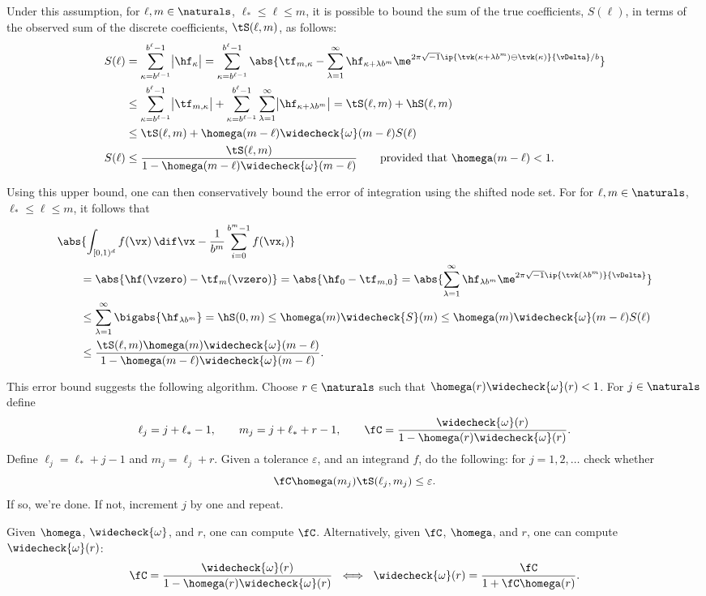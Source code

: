 \documentclass[]{elsarticle}
\newcommand{\fudge}{\fC}
\theoremstyle{definition}
\newcommand{\cube}{[0,1)^d}
\newcommand{\wcS}{\widecheck{S}}
\newcommand{\wcomega}{\widecheck{\omega}}
\begin{document}
Under this assumption, for $\ell, m \in \naturals$, $\ell_* \le \ell \le m$, it is possible to bound the sum of the true coefficients, $S(\ell)$, in terms of the observed sum of the discrete coefficients, $\tS(\ell,m)$, as follows:
\begin{align*}
S(\ell) &= \sum_{\kappa=b^{\ell-1}}^{b^{\ell}-1} \bigl \lvert \hf_{\kappa}\bigr\rvert= \sum_{\kappa=b^{\ell-1}}^{b^{\ell}-1} \abs{\tf_{m,\kappa} - \sum_{\lambda=1}^{\infty} \hf_{\kappa+\lambda b^{m}} \me^{2 \pi \sqrt{-1} \ip{\tvk(\kappa+\lambda b^{m}) \ominus \tvk(\kappa)}{\vDelta}/b}}\\
&\le \sum_{\kappa=b^{\ell-1}}^{b^{\ell}-1} \bigl \lvert \tf_{m,\kappa} \bigr\rvert + \sum_{\kappa=b^{\ell-1}}^{b^{\ell}-1} \sum_{\lambda=1}^{\infty} \bigl \lvert \hf_{\kappa+\lambda b^{m}}\bigr\rvert = \tS(\ell,m) + \hS(\ell,m) \\
&\le \tS(\ell,m) + \homega(m-\ell) \wcomega(m-\ell) S(\ell) \\
S(\ell) & \le \frac{\tS(\ell,m)}{1 - \homega(m-\ell) \wcomega(m-\ell)} \qquad \text{provided that } \homega(m-\ell) < 1.
\end{align*}

Using this upper bound, one can then conservatively bound the error of integration using the shifted node set.  For for $\ell, m \in \naturals$, $\ell_* \le \ell \le m$, it follows that 
\begin{align*}
\MoveEqLeft{\abs{\int_{\cube} f(\vx) \, \dif \vx - \frac{1}{b^m} \sum_{i=0}^{b^m-1} f(\vx_i) }}\\
&= \abs{\hf(\vzero) - \tf_m(\vzero)} = \abs{\hf_0 - \tf_{m,0}} = \abs{\sum_{\lambda=1}^{\infty} \hf_{\lambda b^{m}} \me^{2 \pi \sqrt{-1}\ip{\tvk(\lambda b^{m})}{\vDelta}}}\\
&\le \sum_{\lambda=1}^{\infty} \bigabs{\hf_{\lambda b^{m}}} 
= \hS(0,m) \le \homega(m) \wcS(m) \le \homega(m) \wcomega(m-\ell) S(\ell) \\
& \le \frac{\tS(\ell,m)\homega(m) \wcomega(m-\ell)}{1 - \homega(m-\ell) \wcomega(m-\ell)}.
\end{align*}

This error bound suggests the following algorithm.  Choose $r \in \naturals$ such that $\homega(r)\wcomega(r)<1$.  For $j \in \naturals$ define 
\[
\ell_j=j+\ell_*-1, \qquad  m_j=j+\ell_*+r-1, \qquad  \fudge = \frac{\wcomega(r)}{1 - \homega(r)\wcomega(r)}.
\]
Define $\ell_j=\ell_*+j-1$ and $m_j=\ell_j+r$.  Given a tolerance $\varepsilon$, and an integrand $f$, do the following:  for $j=1, 2, \ldots$ check whether
\[
\fudge \homega(m_j)  \tS(\ell_j,m_j) \le \varepsilon.
\]
If so, we're done.  If not, increment $j$ by one and repeat.

Given $\homega$, $\wcomega$, and $r$, one can compute $\fC$.  Alternatively, given $\fC$, $\homega$, and $r$, one can compute $\wcomega(r)$:
\[
\fudge = \frac{\wcomega(r)}{1 - \homega(r)\wcomega(r)} \ \iff \ \wcomega(r)= \frac{\fC}{1+\fC\homega(r)}.
\]



\end{document}
